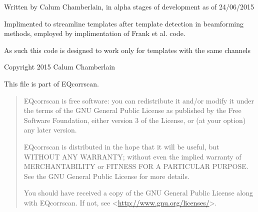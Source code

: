 \documentclass[a4paper,10pt,english]{sphinxmanual}
\begin{document}
Written by Calum Chamberlain, in alpha stages of development as of 24/06/2015

Implimented to streamline templates after template detection in beamforming
methods, employed by implimentation of Frank et al. code.

As such this code is designed to work only for templates with the same channels

Copyright 2015 Calum Chamberlain

This file is part of EQcorrscan.
\begin{quote}

EQcorrscan is free software: you can redistribute it and/or modify
it under the terms of the GNU General Public License as published by
the Free Software Foundation, either version 3 of the License, or
(at your option) any later version.

EQcorrscan is distributed in the hope that it will be useful,
but WITHOUT ANY WARRANTY; without even the implied warranty of
MERCHANTABILITY or FITNESS FOR A PARTICULAR PURPOSE.  See the
GNU General Public License for more details.

You should have received a copy of the GNU General Public License
along with EQcorrscan.  If not, see \textless{}\href{http://www.gnu.org/licenses/}{http://www.gnu.org/licenses/}\textgreater{}.
\end{quote}
\end{document}
